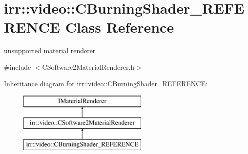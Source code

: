 \hypertarget{classirr_1_1video_1_1_c_burning_shader___r_e_f_e_r_e_n_c_e}{\section{irr\-:\-:video\-:\-:C\-Burning\-Shader\-\_\-\-R\-E\-F\-E\-R\-E\-N\-C\-E Class Reference}
\label{classirr_1_1video_1_1_c_burning_shader___r_e_f_e_r_e_n_c_e}
}


unsupported material renderer  




{\ttfamily \#include $<$C\-Software2\-Material\-Renderer.\-h$>$}

Inheritance diagram for irr\-:\-:video\-:\-:C\-Burning\-Shader\-\_\-\-R\-E\-F\-E\-R\-E\-N\-C\-E\-:\begin{figure}[H]
\begin{center}
\leavevmode
\includegraphics[height=3.000000cm]{classirr_1_1video_1_1_c_burning_shader___r_e_f_e_r_e_n_c_e}
\end{center}
\end{figure}
